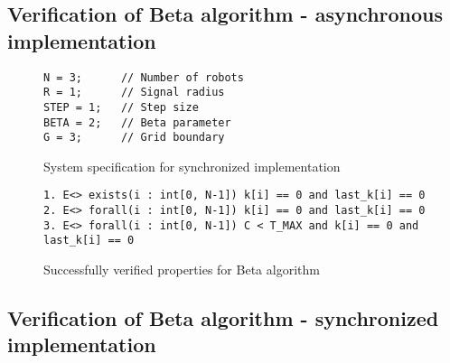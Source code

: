\subsection{Verification of Beta algorithm - asynchronous implementation}
\begin{figure}[H]
\caption{System specification for synchronized implementation}
\label{fig:implementation_synchronised_system}
\begin{lstlisting}[style=code]
N = 3;      // Number of robots
R = 1;      // Signal radius
STEP = 1;   // Step size
BETA = 2;   // Beta parameter
G = 3;      // Grid boundary
\end{lstlisting}
\end{figure}

\begin{figure}[H]
\caption{Successfully verified properties for Beta algorithm}
\label{fig:algorithm_asynchronous_properties}
\begin{lstlisting}[style=code]
1. E<> exists(i : int[0, N-1]) k[i] == 0 and last_k[i] == 0
2. E<> forall(i : int[0, N-1]) k[i] == 0 and last_k[i] == 0
3. E<> forall(i : int[0, N-1]) C < T_MAX and k[i] == 0 and last_k[i] == 0 
\end{lstlisting}    
\end{figure}



\subsection{Verification of Beta algorithm - synchronized implementation}